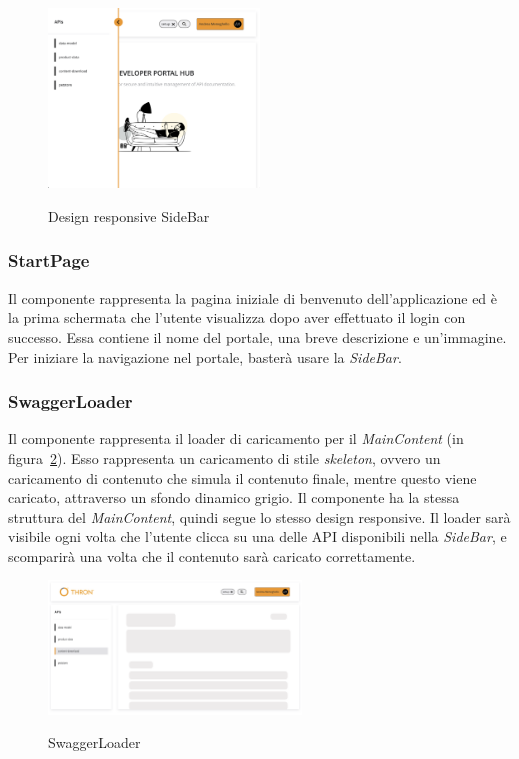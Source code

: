 \begin{figure}[ht]
  \centering
  \includegraphics[width=0.5\textwidth, alt={Design responsive della barra laterale}]{images/frontend/Sidebar.jpg}
  \caption{Design responsive SideBar}\label{fig:side-bar-responsive}
\end{figure}

\subsubsection{StartPage}\label{subsubsec:start-page}
Il componente rappresenta la pagina iniziale di benvenuto dell'applicazione ed è la prima schermata che l'utente visualizza dopo aver effettuato il login con successo.
Essa contiene il nome del portale, una breve descrizione e un'immagine. Per iniziare la navigazione nel portale, basterà usare la \textit{SideBar}.

\subsubsection{SwaggerLoader}\label{subsubsec:swagger-loader}
Il componente rappresenta il loader di caricamento per il \textit{MainContent} (in figura~\ref{fig:swagger-loader}). 
Esso rappresenta un caricamento di stile \textit{skeleton}, ovvero un caricamento di contenuto che simula il contenuto finale, mentre questo viene caricato, attraverso un sfondo dinamico grigio.
Il componente ha la stessa struttura del \textit{MainContent}, quindi segue lo stesso design responsive.
Il loader sarà visibile ogni volta che l'utente clicca su una delle API disponibili nella \textit{SideBar}, e scomparirà una volta che il contenuto sarà caricato correttamente.

\begin{figure}[ht]
  \centering
  \includegraphics[width=0.6\textwidth, alt={Skeleton loader di caricamento per contenuto principale}]{images/frontend/SwaggerLoader.jpg}
  \caption{SwaggerLoader}\label{fig:swagger-loader}
\end{figure}


